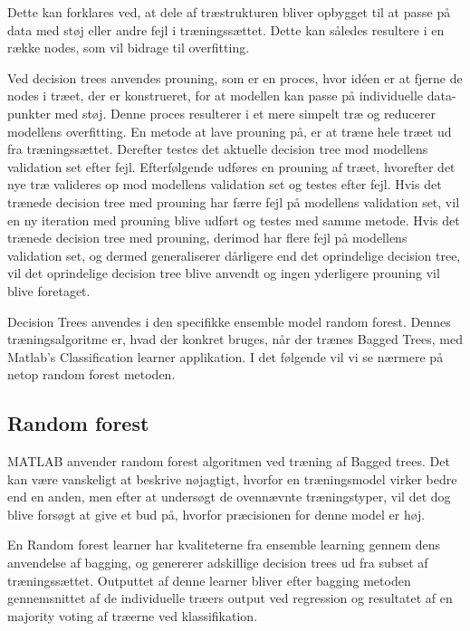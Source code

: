 Dette kan forklares ved, at dele af træstrukturen bliver opbygget til at passe på data med støj eller andre fejl i træningssættet. Dette kan således resultere i en række nodes, som vil bidrage til overfitting.

Ved decision trees anvendes prouning, som er en proces, hvor idéen er at fjerne de nodes i træet, der er konstrueret, for at modellen kan passe på individuelle data-punkter med støj. Denne proces resulterer i et mere simpelt træ og reducerer modellens overfitting. 
En metode at lave prouning på, er at træne hele træet ud fra træningssættet. Derefter testes det aktuelle decision tree mod modellens validation set efter fejl. Efterfølgende udføres en prouning af træet, hvorefter det nye træ valideres op mod modellens validation set og testes efter fejl. Hvis det trænede decision tree med prouning har færre fejl på modellens validation set, vil en ny iteration med prouning blive udført og testes med samme metode. Hvis det trænede decision tree med prouning, derimod har flere fejl på modellens validation set, og dermed generaliserer dårligere end det oprindelige decision tree, vil det oprindelige decision tree blive anvendt og ingen yderligere prouning vil blive foretaget. 

Decision Trees anvendes i den specifikke ensemble model random forest. Dennes træningsalgoritme er, hvad der konkret bruges, når der trænes Bagged Trees, med Matlab’s Classification learner applikation. I det følgende vil vi se nærmere på netop random forest metoden.

\subsection{Random forest}
MATLAB anvender random forest algoritmen ved træning af Bagged trees. Det kan være vanskeligt at beskrive nøjagtigt, hvorfor en træningsmodel virker bedre end en anden, men efter at undersøgt de ovennævnte træningstyper, vil det dog blive forsøgt at give et bud på, hvorfor præcisionen for denne model er høj.

En Random forest learner har kvaliteterne fra ensemble learning gennem dens anvendelse af bagging, og genererer adskillige decision trees ud fra subset af træningssættet. Outputtet af denne learner bliver efter bagging metoden gennemsnittet af de individuelle træers output ved regression og resultatet af en majority voting af træerne ved klassifikation. 

